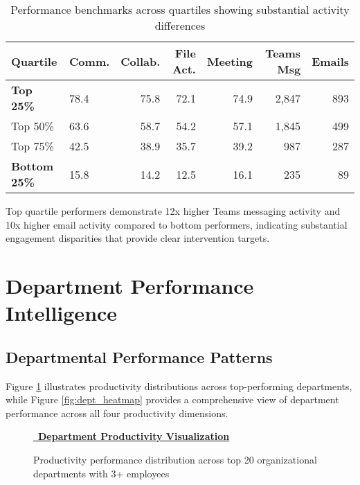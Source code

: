 \documentclass[12pt,a4paper]{article}
\newcommand{\styledimagelink}[2]{\textcolor{accentBlue}{\href{#1}{{\normalsize\faImage}\, \textbf{#2}}}}
\begin{document}
\begin{table}[H]
\centering
\begin{tabularx}{\textwidth}{@{}lXrrrrr@{}}
\toprule
\textbf{\color{primaryBlue}Quartile} & \textbf{\color{primaryBlue}Comm.} & \textbf{\color{primaryBlue}Collab.} & \textbf{\color{primaryBlue}File Act.} & \textbf{\color{primaryBlue}Meeting} & \textbf{\color{primaryBlue}Teams Msg} & \textbf{\color{primaryBlue}Emails} \\
\midrule
\textbf{Top 25\%} & 78.4 & 75.8 & 72.1 & 74.9 & 2,847 & 893 \\
Top 50\% & 63.6 & 58.7 & 54.2 & 57.1 & 1,845 & 499 \\
Top 75\% & 42.5 & 38.9 & 35.7 & 39.2 & 987 & 287 \\
\textbf{Bottom 25\%} & 15.8 & 14.2 & 12.5 & 16.1 & 235 & 89 \\
\bottomrule
\end{tabularx}
\caption{Performance benchmarks across quartiles showing substantial activity differences}
\end{table}

Top quartile performers demonstrate 12x higher Teams messaging activity and 10x higher email activity compared to bottom performers, indicating substantial engagement disparities that provide clear intervention targets.

\section{Department Performance Intelligence}

\subsection{Departmental Performance Patterns}

Figure \ref{fig:dept_productivity} illustrates productivity distributions across top-performing departments, while Figure \ref{fig:dept_heatmap} provides a comprehensive view of department performance across all four productivity dimensions.

\begin{figure}[H]
\centering
\styledimagelink{https://fixysaskihumorizijuv.supabase.co/storage/v1/object/public/research-files/8f657420-a9d0-49f8-a45b-5a8e54d066d4-department_productivity.png?download=}{Department Productivity Visualization}
\caption{Productivity performance distribution across top 20 organizational departments with 3+ employees}
\label{fig:dept_productivity}
\end{figure}
\end{document}
